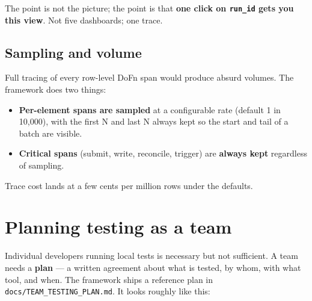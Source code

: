 \documentclass[
  11pt,
  british,
  oneside]{book}
\providecommand{\tightlist}{%
  \setlength{\itemsep}{0pt}\setlength{\parskip}{0pt}}
\begin{document}
The point is not the picture; the point is that \textbf{one click on
\texttt{run\_id} gets you this view}. Not five dashboards; one trace.

\hypertarget{sampling-and-volume}{%
\subsection{Sampling and volume}\label{sampling-and-volume}}

Full tracing of every row-level DoFn span would produce absurd volumes.
The framework does two things:

\begin{itemize}
\tightlist
\item
  \textbf{Per-element spans are sampled} at a configurable rate (default
  1 in 10,000), with the first N and last N always kept so the start and
  tail of a batch are visible.
\item
  \textbf{Critical spans} (submit, write, reconcile, trigger) are
  \textbf{always kept} regardless of sampling.
\end{itemize}

Trace cost lands at a few cents per million rows under the defaults.

\hypertarget{planning-testing-as-a-team}{%
\section{Planning testing as a team}\label{planning-testing-as-a-team}}

Individual developers running local tests is necessary but not
sufficient. A team needs a \textbf{plan} --- a written agreement about
what is tested, by whom, with what tool, and when. The framework ships a
reference plan in \texttt{docs/TEAM\_TESTING\_PLAN.md}. It looks roughly
like this:
\end{document}
